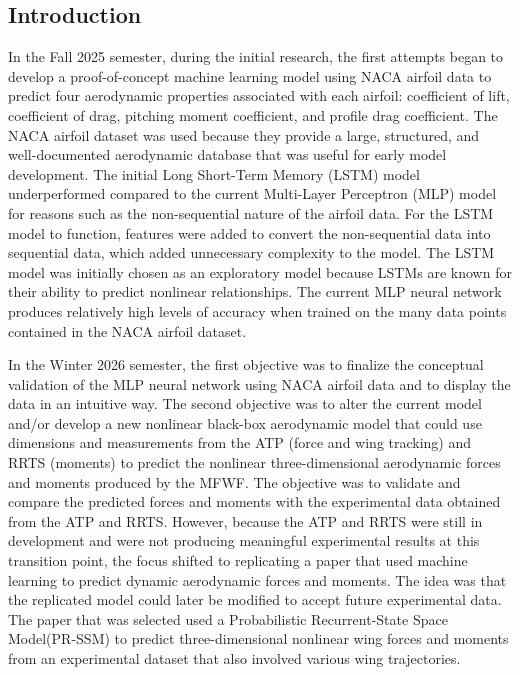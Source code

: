 
\subsection{Introduction}
In the Fall 2025 semester, during the initial research, the first attempts began to develop a proof-of-concept machine learning model using NACA airfoil data to predict four aerodynamic properties associated with each airfoil: coefficient of lift, coefficient of drag, pitching moment coefficient, and profile drag coefficient. The NACA airfoil dataset was used because they provide a large, structured, and well-documented aerodynamic database that was useful for early model development. The initial Long Short-Term Memory (LSTM) model underperformed compared to the current Multi-Layer Perceptron (MLP) model for reasons such as the non-sequential nature of the airfoil data. For the LSTM model to function, features were added to convert the non-sequential data into sequential data, which added unnecessary complexity to the model. The LSTM model was initially chosen as an exploratory model because LSTMs are known for their ability to predict nonlinear relationships. The current MLP neural network produces relatively high levels of accuracy when trained on the many data points contained in the NACA airfoil dataset.

In the Winter 2026 semester, the first objective was to finalize the conceptual validation of the MLP neural network using NACA airfoil data and to display the data in an intuitive way. The second objective was to alter the current model and/or develop a new nonlinear black-box aerodynamic model that could use dimensions and measurements from the ATP (force and wing tracking) and RRTS (moments) to predict the nonlinear three-dimensional aerodynamic forces and moments produced by the MFWF. The objective was to validate and compare the predicted forces and moments with the experimental data obtained from the ATP and RRTS. However, because the ATP and RRTS were still in development and were not producing meaningful experimental results at this transition point, the focus shifted to replicating a paper that used machine learning to predict dynamic aerodynamic forces and moments. The idea was that the replicated model could later be modified to accept future experimental data. The paper that was selected used a Probabilistic Recurrent-State Space Model(PR-SSM) to predict three-dimensional nonlinear wing forces and moments from an experimental dataset that also involved various wing trajectories.

